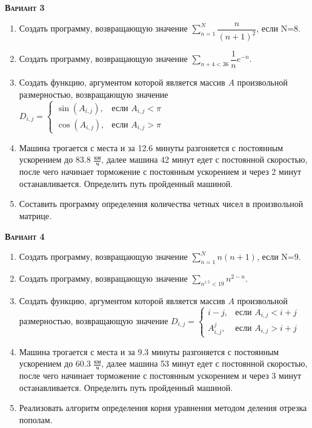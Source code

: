 \textsc{\textbf{Вариант 3}}
\begin{enumerate}
\item  Создать программу, возвращающую значение $\sum\limits_{n=1}^{N} \dfrac{n}{(n+1)^2}            $, если N=8. 
\item  Создать программу, возвращающую значение $\sum\limits_{n+4<      36} {\dfrac{1}{n} e^{-n}}         $. 
\item Создать функцию, аргументом которой является массив $A$ произвольной размерностью, возвращающую значение $D_{i,j}=\begin{cases} \sin(A_{i,j}), & \text{если } A_{i,j}<\pi \\ \cos(A_{i,j}), & \text{если } A_{i,j}>\pi \end{cases}                     $ 
\item Машина трогается с места и за 12.6 минуты разгоняется с постоянным ускорением до 83.8 ${\frac{км}{ч}}$, далее машина   42 минут едет с постоянной скоростью, после чего начинает торможение с постоянным ускорением и через   2 минут останавливается. Определить путь пройденный машиной.  \item Составить программу определения количества четных чисел в произвольной матрице.                                                                                                                                                                                                  

\end{enumerate}
\textsc{\textbf{Вариант 4}}
\begin{enumerate}
\item  Создать программу, возвращающую значение $\sum\limits_{n=1}^{N} {n (n+1)}                     $, если N=9. 
\item  Создать программу, возвращающую значение $\sum\limits_{n^{1.5}<  19} n^{2-n}                       $. 
\item Создать функцию, аргументом которой является массив $A$ произвольной размерностью, возвращающую значение $D_{i,j}=\begin{cases} i-j, & \text{если } {A_{i,j}}<i+j \\  A_{i,j}^j, & \text{если } {A_{i,j}}>i+j \end{cases}                              $ 
\item Машина трогается с места и за  9.3 минуты разгоняется с постоянным ускорением до 60.3 ${\frac{км}{ч}}$, далее машина   53 минут едет с постоянной скоростью, после чего начинает торможение с постоянным ускорением и через   3 минут останавливается. Определить путь пройденный машиной.  \item Реализовать алгоритм определения корня уравнения методом деления отрезка пополам.                                                                                                                                                                                              

\end{enumerate}
